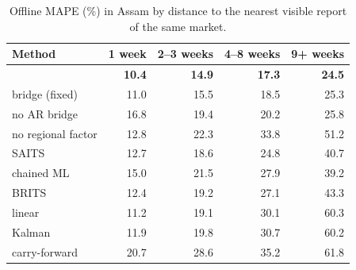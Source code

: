 \begin{table}[tbp]
\caption{Offline MAPE (\%) in Assam by distance to the nearest visible report of the same market.}
\label{tab:gaplen}
\small
\begin{tabular}{lrrrr}
\toprule
Method & 1 week & 2--3 weeks & 4--8 weeks & 9+ weeks \\
\midrule
\auto{} & \textbf{10.4} & \textbf{14.9} & \textbf{17.3} & \textbf{24.5} \\
bridge (fixed) & 11.0 & 15.5 & 18.5 & 25.3 \\
no AR bridge & 16.8 & 19.4 & 20.2 & 25.8 \\
no regional factor & 12.8 & 22.3 & 33.8 & 51.2 \\
SAITS & 12.7 & 18.6 & 24.8 & 40.7 \\
chained ML & 15.0 & 21.5 & 27.9 & 39.2 \\
BRITS & 12.4 & 19.2 & 27.1 & 43.3 \\
linear & 11.2 & 19.1 & 30.1 & 60.3 \\
Kalman & 11.9 & 19.8 & 30.7 & 60.2 \\
carry-forward & 20.7 & 28.6 & 35.2 & 61.8 \\
\bottomrule
\end{tabular}
\end{table}
